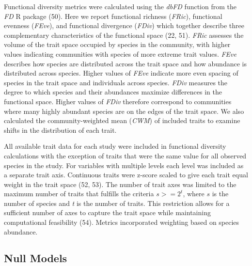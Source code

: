 \documentclass{article}
\begin{document}
Functional diversity metrics were calculated using the \emph{dbFD}
function from the \emph{FD} R package (50). Here we report functional
richness (\emph{FRic}), functional evenness (\emph{FEve}), and
functional divergence (\emph{FDiv}) which together describe three
complementary characteristics of the functional space (22, 51).
\emph{FRic} assesses the volume of the trait space occupied by species
in the community, with higher values indicating communities with species
of more extreme trait values. \emph{FEve} describes how species are
distributed across the trait space and how abundance is distributed
across species. Higher values of \emph{FEve} indicate more even spacing
of species in the trait space and individuals across species.
\emph{FDiv} measures the degree to which species and their abundances
maximize differences in the functional space. Higher values of
\emph{FDiv} therefore correspond to communities where many highly
abundant species are on the edges of the trait space. We also calculated
the community-weighted mean (\emph{CWM}) of included traits to examine
shifts in the distribution of each trait.

All available trait data for each study were included in functional
diversity calculations with the exception of traits that were the same
value for all observed species in the study. For variables with multiple
levels each level was included as a separate trait axis. Continuous
traits were z-score scaled to give each trait equal weight in the trait
space (52, 53). The number of trait axes was limited to the maximum
number of traits that fulfills the criteria \(s >= 2^t\), where \(s\) is
the number of species and \emph{t} is the number of traits. This
restriction allows for a sufficient number of axes to capture the trait
space while maintaining computational feasibility (54). Metrics
incorporated weighting based on species abundance.

\hypertarget{null-models}{%
\subsection{Null Models}\label{null-models}}
\end{document}
